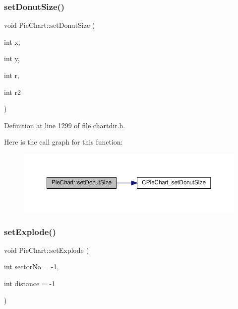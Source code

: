 \subsubsection{\texorpdfstring{set\+Donut\+Size()}{setDonutSize()}}
{\footnotesize\ttfamily void Pie\+Chart\+::set\+Donut\+Size (\begin{DoxyParamCaption}\item[{int}]{x,  }\item[{int}]{y,  }\item[{int}]{r,  }\item[{int}]{r2 }\end{DoxyParamCaption})\hspace{0.3cm}{\ttfamily [inline]}}



Definition at line 1299 of file chartdir.\+h.

Here is the call graph for this function\+:
\nopagebreak
\begin{figure}[H]
\begin{center}
\leavevmode
\includegraphics[width=350pt]{class_pie_chart_a142e2140586f2462f74a4eaf9ee6739c_cgraph}
\end{center}
\end{figure}
\mbox{\label{class_pie_chart_a0c4c811dad237d549fc5461a51109a1a}} 
\subsubsection{\texorpdfstring{set\+Explode()}{setExplode()}}
{\footnotesize\ttfamily void Pie\+Chart\+::set\+Explode (\begin{DoxyParamCaption}\item[{int}]{sector\+No = {\ttfamily -\/1},  }\item[{int}]{distance = {\ttfamily -\/1} }\end{DoxyParamCaption})\hspace{0.3cm}{\ttfamily [inline]}}



